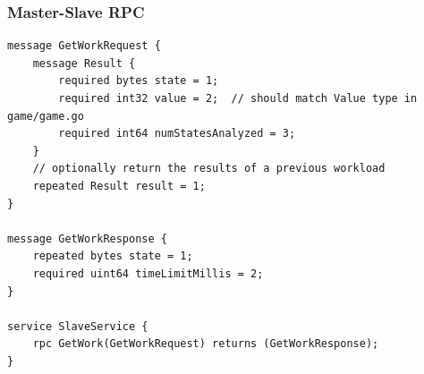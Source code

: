 \documentclass[pdftex,12pt,a4paper]{article}
\begin{document}
\subsubsection*{Master-Slave RPC}
\begin{framed}
\begin{lstlisting}
message GetWorkRequest {
    message Result {
        required bytes state = 1;
        required int32 value = 2;  // should match Value type in game/game.go
        required int64 numStatesAnalyzed = 3;
    }
    // optionally return the results of a previous workload
    repeated Result result = 1;
}

message GetWorkResponse {
    repeated bytes state = 1;
    required uint64 timeLimitMillis = 2;
}

service SlaveService {
    rpc GetWork(GetWorkRequest) returns (GetWorkResponse);
}
\end{lstlisting}
\end{framed}
\end{document}
